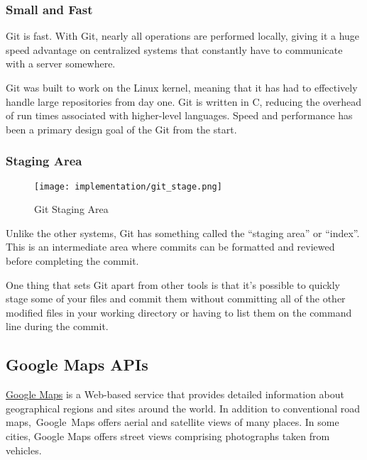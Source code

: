 	\subsubsection{Small and Fast}
		Git is fast. With Git, nearly all operations are performed locally, giving it a huge speed advantage on centralized systems that constantly have to communicate with a server somewhere.
		
		Git was built to work on the Linux kernel, meaning that it has had to effectively handle large repositories from day one. Git is written in C, reducing the overhead of run times associated with higher-level languages. Speed and performance has been a primary design goal of the Git from the start.
	\subsubsection{Staging Area}
			\begin{wrapfigure}{r}{0.25\textwidth}
				\texttt{[image: implementation/git\_stage.png]}
				\caption{Git Staging Area}
			\end{wrapfigure}
		Unlike the other systems, Git has something called the ``staging area'' or ``index''. This is an intermediate area where commits can be formatted and reviewed before completing the commit.
		
		One thing that sets Git apart from other tools is that it's possible to quickly stage some of your files and commit them without committing all of the other modified files in your working directory or having to list them on the command line during the commit.
		
\subsection{Google Maps APIs}
	\href{https://developers.google.com/maps/}{Google Maps} is a Web-based service that provides detailed information about geographical regions and sites around the world. In addition to conventional road maps, Google Maps offers aerial and satellite views of many places. In some cities, Google Maps offers street views comprising photographs taken from vehicles.\cite{google_maps}

